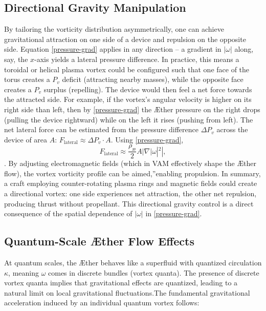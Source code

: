 \subsection*{Directional Gravity Manipulation}
By tailoring the vorticity distribution asymmetrically, one can achieve gravitational attraction on one side of a device and repulsion on the opposite side. Equation \eqref{pressure-grad} applies in any direction – a gradient in $|\omega|$ along, say, the $x$-axis yields a lateral pressure difference. In practice, this means a toroidal or helical plasma vortex could be configured such that one face of the torus creates a $P_v$ deficit (attracting nearby masses), while the opposite face creates a $P_v$ surplus (repelling). The device would then feel a net force towards the attracted side. For example, if the vortex's angular velocity is higher on its right side than left, then by \eqref{pressure-grad} the Æther pressure on the right drops (pulling the device rightward) while on the left it rises (pushing from left). The net lateral force can be estimated from the pressure difference $\Delta P_v$ across the device of area $A$: $F_{\text{lateral}}\approx \Delta P_v \cdot A$. Using \eqref{pressure-grad},
\begin{equation}
    F_\text{lateral} \approx \frac{\rho_\text{\ae}}{2} A |\nabla |\omega|^2|,
    \label{eq:lateral_force}
\end{equation}
. By adjusting electromagnetic fields (which in VAM effectively shape the Æther flow), the vortex vorticity profile can be \grqq aimed,\textquotedblright enabling propulsion. In summary, a craft employing counter-rotating plasma rings and magnetic fields could create a directional vortex: one side experiences net attraction, the other net repulsion, producing thrust without propellant. This directional gravity control is a direct consequence of the spatial dependence of $|\omega|$ in \eqref{pressure-grad}.

\subsection*{Quantum-Scale Æther Flow Effects}
At quantum scales, the Æther behaves like a superfluid with quantized circulation $\kappa$, meaning $\omega$ comes in discrete bundles (vortex quanta). The presence of discrete vortex quanta implies that gravitational effects are quantized, leading to a natural limit on local gravitational fluctuations.The fundamental gravitational acceleration induced by an individual quantum vortex follows:

